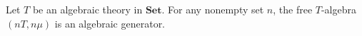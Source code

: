 Let $T$ be an algebraic theory in $\mathbf{Set}$. For any nonempty set $n$, the free $T$-algebra $(nT, n\mu)$ is an algebraic generator.
